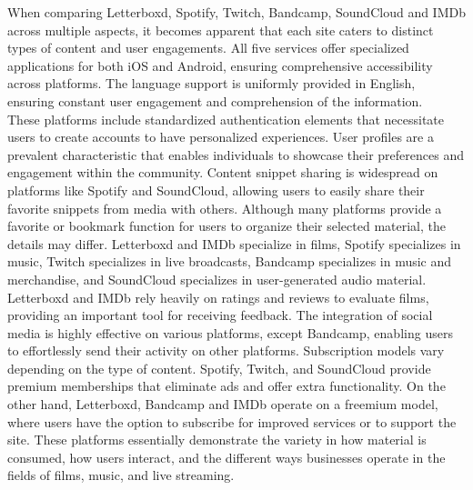 When comparing Letterboxd, Spotify, Twitch, Bandcamp, SoundCloud and IMDb across multiple aspects, it becomes apparent that each site caters to distinct types of content and user engagements. All five services offer specialized applications for both iOS and Android, ensuring comprehensive accessibility across platforms. The language support is uniformly provided in English, ensuring constant user engagement and comprehension of the information. \\

These platforms include standardized authentication elements that necessitate users to create accounts to have personalized experiences. User profiles are a prevalent characteristic that enables individuals to showcase their preferences and engagement within the community. Content snippet sharing is widespread on platforms like Spotify and SoundCloud, allowing users to easily share their favorite snippets from media with others. Although many platforms provide a favorite or bookmark function for users to organize their selected material, the details may differ. Letterboxd and IMDb specialize in films, Spotify specializes in music, Twitch specializes in live broadcasts, Bandcamp specializes in music and merchandise, and SoundCloud specializes in user-generated audio material. \\

Letterboxd and IMDb rely heavily on ratings and reviews to evaluate films, providing an important tool for receiving feedback. The integration of social media is highly effective on various platforms, except Bandcamp, enabling users to effortlessly send their activity on other platforms. Subscription models vary depending on the type of content. Spotify, Twitch, and SoundCloud provide premium memberships that eliminate ads and offer extra functionality. On the other hand, Letterboxd, Bandcamp and IMDb operate on a freemium model, where users have the option to subscribe for improved services or to support the site. These platforms essentially demonstrate the variety in how material is consumed, how users interact, and the different ways businesses operate in the fields of films, music, and live streaming.